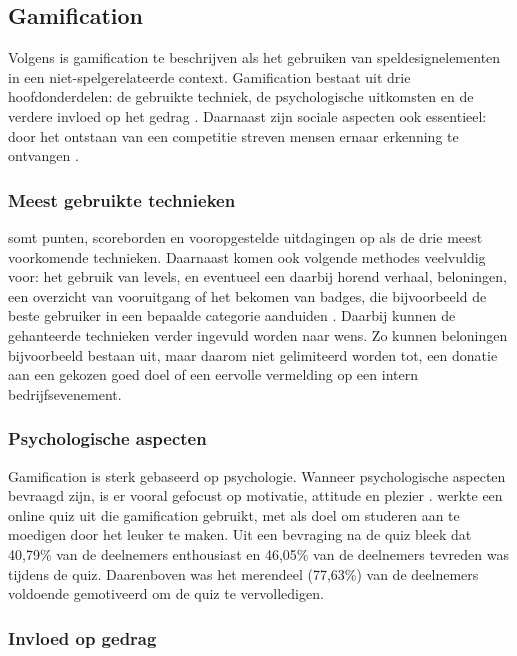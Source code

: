 \subsection{Gamification}

Volgens \textcite{Deterding2011} is gamification te beschrijven als het gebruiken van speldesignelementen in een niet-spelgerelateerde context. Gamification bestaat uit drie hoofdonderdelen: de gebruikte techniek, de psychologische uitkomsten en de verdere invloed op het gedrag \autocite{Hamari2014}. Daarnaast zijn sociale aspecten ook essentieel: door het ontstaan van een competitie streven mensen ernaar erkenning te ontvangen \autocite{Hamari2013}.

\subsubsection{Meest gebruikte technieken}

\textcite{Hamari2014} somt punten, scoreborden en vooropgestelde uitdagingen op als de drie \linebreak meest voorkomende technieken. Daarnaast komen ook volgende methodes veelvuldig voor: het gebruik van levels, en eventueel een daarbij horend verhaal, beloningen, een overzicht van vooruitgang of het bekomen van badges, die bijvoorbeeld de beste gebruiker in een bepaalde categorie aanduiden \autocite{Dong2012,Flatla2011,Li2012}.
Daarbij kunnen de gehanteerde technieken verder ingevuld worden naar wens. Zo kunnen beloningen bijvoorbeeld bestaan uit, maar daarom niet gelimiteerd worden tot, een donatie aan een gekozen goed doel of een eervolle vermelding op een intern bedrijfsevenement.


\subsubsection{Psychologische aspecten}

Gamification is sterk gebaseerd op psychologie. Wanneer psychologische aspecten bevraagd zijn, is er vooral gefocust op motivatie, attitude en plezier \autocite{Hamari2014}. \textcite{Cheong2013} werkte een online quiz uit die gamification gebruikt, met als doel om studeren aan te moedigen door het leuker te maken. Uit een bevraging  na de quiz bleek dat 40,79\% van de deelnemers enthousiast en 46,05\% van de deelnemers tevreden was tijdens de quiz. Daarenboven was het merendeel (77,63\%) van de deelnemers voldoende gemotiveerd om de quiz te vervolledigen.

\subsubsection{Invloed op gedrag}

